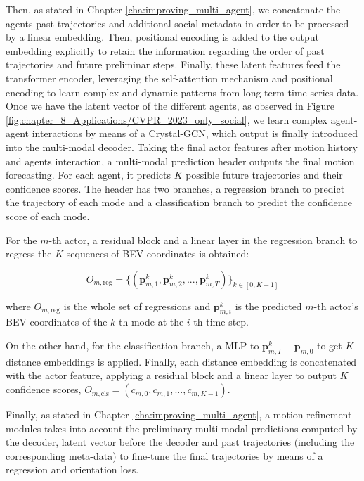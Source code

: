 Then, as stated in Chapter \ref{cha:improving_multi_agent}, we concatenate the agents past trajectories and additional social metadata in order to be processed by a linear embedding. Then, positional encoding is added to the output embedding explicitly to retain the information regarding the order of past trajectories and future preliminar steps. Finally, these latent features feed the transformer encoder, leveraging the self-attention mechanism and positional encoding to learn complex and dynamic patterns from long-term time series data. Once we have the latent vector of the different agents, as observed in Figure \ref{fig:chapter_8_Applications/CVPR_2023_only_social}, we learn complex agent-agent interactions by means of a Crystal-\ac{GCN}, which output is finally introduced into the multi-modal decoder. Taking the final actor features after motion history and agents interaction, a multi-modal prediction header outputs the final motion forecasting. For each agent, it predicts $K$ possible future trajectories and their confidence scores. The header has two branches, a regression branch to predict the trajectory of each mode and a classification branch to predict the confidence score of each mode.

For the $m$-th actor, a residual block and a linear layer in the regression branch to regress the $K$ sequences of \ac{BEV} coordinates is obtained:

\begin{equation}
	O_{m, \text{reg}} = \{ (\mathbf{p}_{m,1}^k, \mathbf{p}_{m,2}^k, ..., \mathbf{p}_{m,T}^k) \}_{k \in [0, K-1]}
\end{equation}

where $O_{m, \text{reg}}$ is the whole set of regressions and $\mathbf{p}_{m,i}^k$ is the predicted $m$-th actor's BEV coordinates of the $k$-th mode at the $i$-th time step.

On the other hand, for the classification branch, a MLP to $\mathbf{p}_{m,T}^k - \mathbf{p}_{m,0}$ to get $K$ distance embeddings is applied. Finally, each distance embedding is concatenated with the actor feature, applying a residual block and a linear layer to output $K$ confidence scores, $O_{m, \text{cls}} = (c_{m,0}, c_{m,1}, ..., c_{m,K-1})$.

Finally, as stated in Chapter \ref{cha:improving_multi_agent}, a motion refinement modules takes into account the preliminary multi-modal predictions computed by the decoder, latent vector before the decoder and past trajectories (including the corresponding meta-data) to fine-tune the final trajectories by means of a regression and orientation loss.


